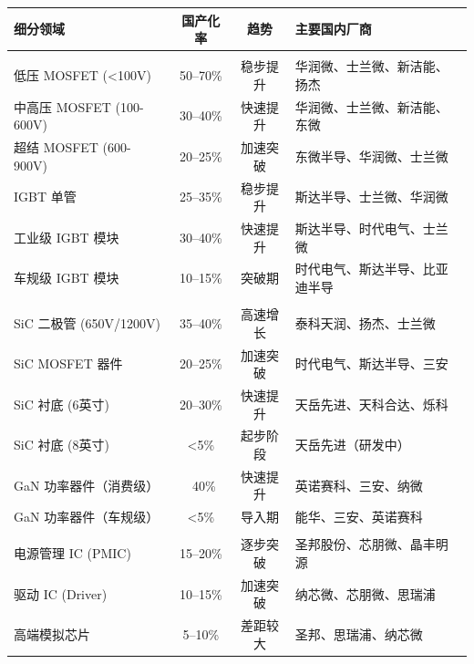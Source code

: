 \begin{exhibitbox}[表 5-2：功率半导体各环节国产化率全景]
\centering
\small
\begin{tabularx}{\textwidth}{L{3.5cm} c c X}
\toprule
\textbf{细分领域} & \textbf{国产化率} & \textbf{趋势} & \textbf{主要国内厂商} \\
\midrule
{}
 \\
低压 MOSFET (<100V) & 50–70\% & \textcolor{riskgreen}{稳步提升} & 华润微、士兰微、新洁能、扬杰 \\
中高压 MOSFET (100-600V) & 30–40\% & \textcolor{riskgreen}{快速提升} & 华润微、士兰微、新洁能、东微 \\
超结 MOSFET (600-900V) & 20–25\% & \textcolor{riskgreen}{加速突破} & 东微半导、华润微、士兰微 \\
IGBT 单管 & 25–35\% & \textcolor{riskgreen}{稳步提升} & 斯达半导、士兰微、华润微 \\
工业级 IGBT 模块 & 30–40\% & \textcolor{riskgreen}{快速提升} & 斯达半导、时代电气、士兰微 \\
车规级 IGBT 模块 & 10–15\% & \textcolor{riskgreen}{突破期} & 时代电气、斯达半导、比亚迪半导 \\
\midrule
{}
 \\
SiC 二极管 (650V/1200V) & 35–40\% & \textcolor{riskgreen}{高速增长} & 泰科天润、扬杰、士兰微 \\
SiC MOSFET 器件 & 20–25\% & \textcolor{riskgreen}{加速突破} & 时代电气、斯达半导、三安 \\
SiC 衬底 (6英寸) & 20–30\% & \textcolor{riskgreen}{快速提升} & 天岳先进、天科合达、烁科 \\
SiC 衬底 (8英寸) & <5\% & \textcolor{riskamber}{起步阶段} & 天岳先进（研发中）\\
GaN 功率器件（消费级） & ~40\% & \textcolor{riskgreen}{快速提升} & 英诺赛科、三安、纳微 \\
GaN 功率器件（车规级） & <5\% & \textcolor{riskamber}{导入期} & 能华、三安、英诺赛科 \\
\midrule
{}
 \\
电源管理 IC (PMIC) & 15–20\% & \textcolor{riskgreen}{逐步突破} & 圣邦股份、芯朋微、晶丰明源 \\
驱动 IC (Driver) & 10–15\% & \textcolor{riskgreen}{加速突破} & 纳芯微、芯朋微、思瑞浦 \\
高端模拟芯片 & 5–10\% & \textcolor{riskamber}{差距较大} & 圣邦、思瑞浦、纳芯微 \\

\end{tabularx}
\end{exhibitbox}
